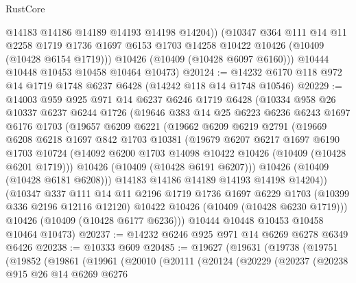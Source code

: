 \begin{lexlean}{RustCore}
\begin{coremodule}
            @14183
            @14186
            @14189
            @14193
            @14198
            @14204))
        (@10347
          @364
          @111
          @14
          @11
          @2258
          @1719
          @1736
          @1697
          @6153
          @1703
          @14258
          @10422
          @10426
          (@10409 (@10428 @6154 @1719)))
        @10426
        (@10409 (@10428 @6097 @6160)))
      @10444
      @10448
      @10453
      @10458
      @10464
      @10473)
@20124 := @14232 @6170 @118 @972 @14 @1719 @1748 @6237 @6428 (@14242 @118 @14 @1748 @10546)
@20229 := @14003
    @959
    @925
    @971
    @14
    @6237
    @6246
    @1719
    @6428
    (@10334
      @958
      @26
      @10337
      @6237
      @6244
      @1726
      (@19646
        @383
        @14
        @25
        @6223
        @6236
        @6243
        @1697
        @6176
        @1703
        (@19657
          @6209
          @6221
          (@19662
            @6209
            @6219
            @2791
            (@19669
              @6208
              @6218
              @1697
              @842
              @1703
              @10381
              (@19679
                @6207
                @6217
                @1697
                @6190
                @1703
                @10724
                (@14092 @6200 @1703 @14098 @10422 @10426 (@10409 (@10428 @6201 @1719)))
                @10426
                (@10409 (@10428 @6191 @6207)))
              @10426
              (@10409 (@10428 @6181 @6208)))
            @14183
            @14186
            @14189
            @14193
            @14198
            @14204))
        (@10347
          @337
          @111
          @14
          @11
          @2196
          @1719
          @1736
          @1697
          @6229
          @1703
          (@10399 @336 @2196 @12116 @12120)
          @10422
          @10426
          (@10409 (@10428 @6230 @1719)))
        @10426
        (@10409 (@10428 @6177 @6236)))
      @10444
      @10448
      @10453
      @10458
      @10464
      @10473)
@20237 := @14232 @6246 @925 @971 @14 @6269 @6278 @6349 @6426
@20238 := @10333 @609
@20485 := @19627
    (@19631
      (@19738
        (@19751
          (@19852
            (@19861
              (@19961
                (@20010
                  (@20111
                    (@20124
                      (@20229
                        (@20237
                          (@20238
                            @915
                            @26
                            @14
                            @6269
                            @6276

\end{coremodule}
\end{lexlean}
